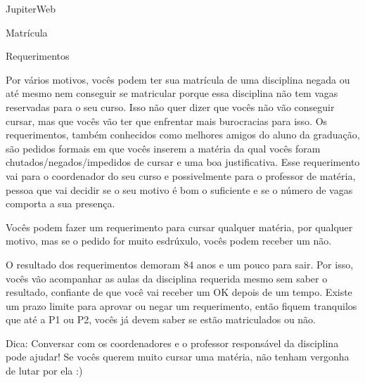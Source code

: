 \begin{secao}{JupiterWeb}
\begin{subsecao}{Matrícula}
\end{subsecao}

\begin{subsecao}{Requerimentos}

Por vários motivos, vocês podem ter sua matrícula de uma disciplina negada ou
até mesmo nem conseguir se matricular porque essa disciplina não tem vagas
reservadas para o seu curso. Isso não quer dizer que vocês não vão conseguir
cursar, mas que vocês vão ter que enfrentar mais burocracias para isso. Os
requerimentos, também conhecidos como melhores amigos do aluno da graduação,
são pedidos formais em que vocês inserem a matéria da qual vocês foram
chutados/negados/impedidos de cursar e uma boa justificativa. Esse requerimento
vai para o coordenador do seu curso e possivelmente para o professor de
matéria, pessoa que vai decidir se o seu motivo é bom o suficiente e se o
número de vagas comporta a sua presença.

Vocês podem fazer um requerimento para cursar qualquer matéria, por qualquer
motivo, mas se o pedido for muito esdrúxulo, vocês podem receber um não.

O resultado dos requerimentos demoram 84 anos e um pouco para sair. Por isso,
vocês vão acompanhar as aulas da disciplina requerida mesmo sem saber o
resultado, confiante de que você vai receber um OK depois de um tempo. Existe
um prazo limite para aprovar ou negar um requerimento, então fiquem tranquilos
que até a P1 ou P2, vocês já devem saber se estão matriculados ou não.

Dica: Conversar com os coordenadores e o professor responsável da disciplina
pode ajudar! Se vocês querem muito cursar uma matéria, não tenham vergonha de
lutar por ela :)

\end{subsecao}

\end{secao}
